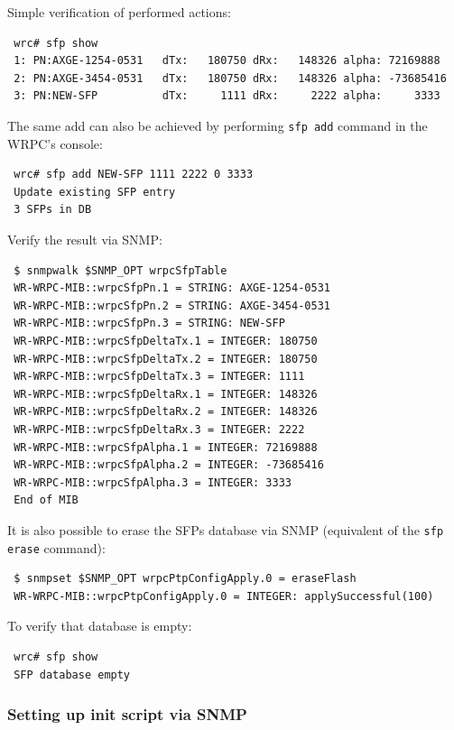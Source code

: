\documentclass[a4paper, 12pt]{article}
\renewcommand{\_}{\underscore\allowbreak}
\begin{document}
Simple verification of performed actions:\\
\begin{minipage}{\textwidth}
\begin{lstlisting}
 wrc# sfp show
 1: PN:AXGE-1254-0531   dTx:   180750 dRx:   148326 alpha: 72169888
 2: PN:AXGE-3454-0531   dTx:   180750 dRx:   148326 alpha: -73685416
 3: PN:NEW-SFP          dTx:     1111 dRx:     2222 alpha:     3333
\end{lstlisting}
\end{minipage}

The same add can also be achieved by performing \texttt{sfp add} command in
the WRPC's console:
\begin{lstlisting}
 wrc# sfp add NEW-SFP 1111 2222 0 3333
 Update existing SFP entry
 3 SFPs in DB
\end{lstlisting}

Verify the result via SNMP:
\begin{lstlisting}
 $ snmpwalk $SNMP_OPT wrpcSfpTable
 WR-WRPC-MIB::wrpcSfpPn.1 = STRING: AXGE-1254-0531
 WR-WRPC-MIB::wrpcSfpPn.2 = STRING: AXGE-3454-0531
 WR-WRPC-MIB::wrpcSfpPn.3 = STRING: NEW-SFP
 WR-WRPC-MIB::wrpcSfpDeltaTx.1 = INTEGER: 180750
 WR-WRPC-MIB::wrpcSfpDeltaTx.2 = INTEGER: 180750
 WR-WRPC-MIB::wrpcSfpDeltaTx.3 = INTEGER: 1111
 WR-WRPC-MIB::wrpcSfpDeltaRx.1 = INTEGER: 148326
 WR-WRPC-MIB::wrpcSfpDeltaRx.2 = INTEGER: 148326
 WR-WRPC-MIB::wrpcSfpDeltaRx.3 = INTEGER: 2222
 WR-WRPC-MIB::wrpcSfpAlpha.1 = INTEGER: 72169888
 WR-WRPC-MIB::wrpcSfpAlpha.2 = INTEGER: -73685416
 WR-WRPC-MIB::wrpcSfpAlpha.3 = INTEGER: 3333
 End of MIB
\end{lstlisting}

It is also possible to erase the SFPs database via SNMP (equivalent of
the \texttt{sfp erase} command):
\begin{lstlisting}
 $ snmpset $SNMP_OPT wrpcPtpConfigApply.0 = eraseFlash
 WR-WRPC-MIB::wrpcPtpConfigApply.0 = INTEGER: applySuccessful(100)
\end{lstlisting}

To verify that database is empty:
\begin{lstlisting}
 wrc# sfp show
 SFP database empty
\end{lstlisting}

\subsubsection{Setting up init script via SNMP}
\label{Setting up init script via SNMP}
\end{document}
